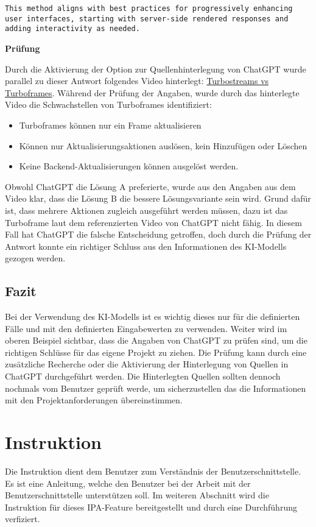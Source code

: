 \texttt{This method aligns with best practices for progressively enhancing user interfaces, starting with server-side rendered responses and adding interactivity as needed.}

\textbf{Prüfung}

Durch die Aktivierung der Option zur Quellenhinterlegung von ChatGPT wurde parallel zu dieser Antwort folgendes Video hinterlegt:
\href{https://youtu.be/vnDWsGtzOCc}{Turbostreams vs Turboframes}. Während der Prüfung der Angaben, wurde durch das hinterlegte Video die Schwachstellen von Turboframes identifiziert:

\begin{itemize}
   \item Turboframes können nur ein Frame aktualisieren
   \item Können nur Aktualisierungsaktionen auslösen, kein Hinzufügen oder Löschen
   \item Keine Backend-Aktualisierungen können ausgelöst werden.
\end{itemize}

Obwohl ChatGPT die Lösung A preferierte, wurde aus den Angaben aus dem Video klar, dass die Lösung B die bessere Lösungsvariante sein wird. 
Grund dafür ist, dass mehrere Aktionen zugleich ausgeführt werden müssen, dazu ist das Turboframe laut dem referenzierten Video von ChatGPT nicht fähig. 
In diesem Fall hat ChatGPT die falsche Entscheidung getroffen, doch durch die Prüfung der Antwort konnte ein richtiger Schluss aus den Informationen des KI-Modells gezogen werden.

\subsection{Fazit}
Bei der Verwendung des KI-Modells ist es wichtig dieses nur für die definierten Fälle und mit den definierten Eingabewerten zu verwenden.
Weiter wird im oberen Beispiel sichtbar, dass die Angaben von ChatGPT zu prüfen sind, um die richtigen Schlüsse für das eigene Projekt 
zu ziehen. Die Prüfung kann durch eine zusätzliche Recherche oder die Aktivierung der Hinterlegung von Quellen in ChatGPT durchgeführt werden.
Die Hinterlegten Quellen sollten dennoch nochmals vom Benutzer geprüft werde, um sicherzustellen das die Informationen mit den Projektanforderungen
übereinstimmen. 

\newpage



\newpage

\section{Instruktion}
Die Instruktion dient dem Benutzer zum Verständnis der Benutzerschnittstelle. Es ist eine Anleitung, welche den Benutzer bei der Arbeit 
mit der Benutzerschnittstelle unterstützen soll. Im weiteren Abschnitt wird die Instruktion für dieses IPA-Feature bereitgestellt und durch eine
Durchführung verfiziert.

